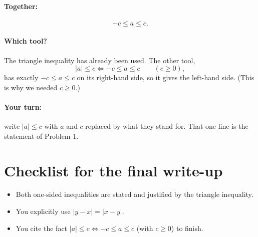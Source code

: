\documentclass[11pt]{article}
\begin{document}
\paragraph{Together:}
\[
  -c \le a \le c .
\]

\paragraph{Which tool?} The triangle inequality has already been used.
The other tool,
\[
  |a| \le c \iff -c \le a \le c \qquad (c \ge 0),
\]
has exactly $-c \le a \le c$ on its right-hand side, so it gives the
left-hand side. (This is why we needed $c \ge 0$.)

\paragraph{Your turn:} write $|a| \le c$ with $a$ and $c$ replaced by
what they stand for. That one line is the statement of Problem 1.

\vspace{2cm}

\section*{Checklist for the final write-up}
\begin{itemize}
  \item Both one-sided inequalities are stated and justified by the
        triangle inequality.
  \item You explicitly use $|y-x| = |x-y|$.
  \item You cite the fact $|a|\le c \iff -c\le a\le c$ (with $c\ge0$) to
        finish.
\end{itemize}
\end{document}
